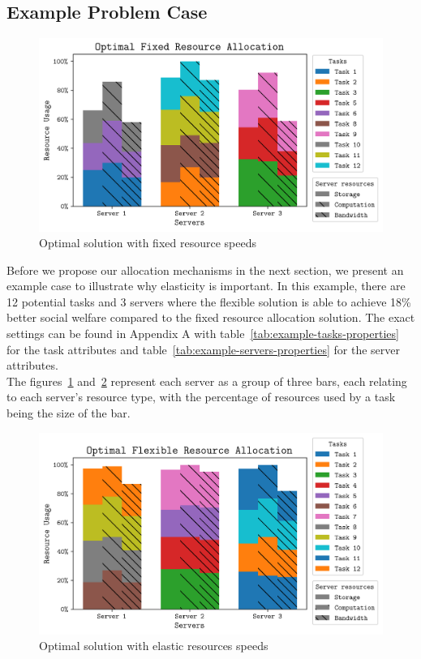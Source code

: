 \subsection{Example Problem Case}
\label{subsec:example-problem-case}
\begin{figure}
    \centering
    \includegraphics[width=\linewidth]{figs/allocation/optimal_fixed_resource_allocation.png}
    \caption{Optimal solution with fixed resource speeds}
    \label{fig:example-fixed-allocation}
\end{figure}
Before we propose our allocation mechanisms in the next section, we present an example case to illustrate
why elasticity is important. In this example, there are 12 potential tasks and 3 servers where the flexible solution
is able to achieve 18\% better social welfare compared to the fixed resource allocation solution.
The exact settings can be found in Appendix A with table~\ref{tab:example-tasks-properties}
for the task attributes and table~\ref{tab:example-servers-properties} for the server attributes. \\
The figures~\ref{fig:example-fixed-allocation} and~\ref{fig:example-flexible-allocation} represent each server as a
group of three bars, each relating to each server's resource type, with the percentage of resources used by a task
being the size of the bar.

\begin{figure}
    \centering
    \includegraphics[width=0.5\linewidth]{figs/allocation/optimal_flexible_resource_allocation.png}
    \caption{Optimal solution with elastic resources speeds}
    \label{fig:example-flexible-allocation}
\end{figure}

